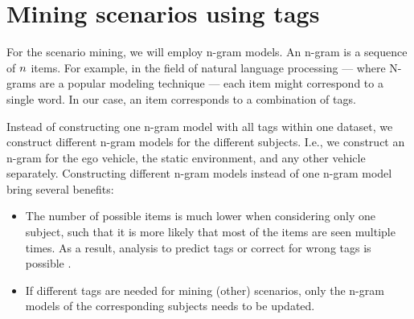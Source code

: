 \section{Mining scenarios using tags}
\label{sec:mining}


\cstartb
For the scenario mining, we will employ n-gram models. An n-gram is a sequence of $n$ items. 
For example, in the field of natural language processing --- where N-grams are a popular modeling technique \autocite{hull1982experiments,brown1992class} --- each item might correspond to a single word. 
In our case, an item corresponds to a combination of tags. 

Instead of constructing one n-gram model with all tags within one dataset, we construct different n-gram models for the different subjects. 
I.e., we construct an n-gram for the ego vehicle, the static environment, and any other vehicle separately.
Constructing different n-gram models instead of one n-gram model bring several benefits:
\begin{itemize}
	\item The number of possible items is much lower when considering only one subject, such that it is more likely that most of the items are seen multiple times. As a result, analysis to predict tags or correct for wrong tags is possible \autocite{lesher1998optimal}.
	\item If different tags are needed for mining (other) scenarios, only the n-gram models of the corresponding subjects needs to be updated.
\end{itemize}



\cendb
